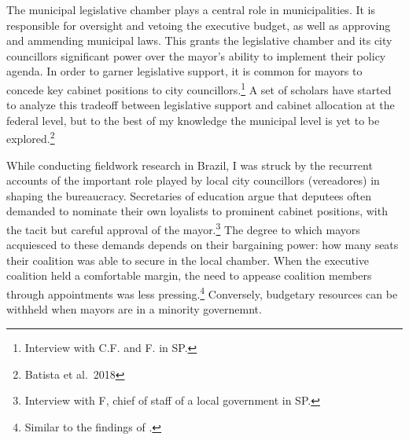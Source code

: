 \documentclass[12pt,]{book}
\newenvironment{Shaded}{\begin{snugshade}}{\end{snugshade}}
\newcommand{\CharTok}[1]{\textcolor[rgb]{0.31,0.60,0.02}{#1}}
\newcommand{\DataTypeTok}[1]{\textcolor[rgb]{0.13,0.29,0.53}{#1}}
\newcommand{\DecValTok}[1]{\textcolor[rgb]{0.00,0.00,0.81}{#1}}
\newcommand{\FloatTok}[1]{\textcolor[rgb]{0.00,0.00,0.81}{#1}}
\newcommand{\KeywordTok}[1]{\textcolor[rgb]{0.13,0.29,0.53}{\textbf{#1}}}
\newcommand{\NormalTok}[1]{#1}
\newcommand{\OperatorTok}[1]{\textcolor[rgb]{0.81,0.36,0.00}{\textbf{#1}}}
\newcommand{\StringTok}[1]{\textcolor[rgb]{0.31,0.60,0.02}{#1}}
\let\rmarkdownfootnote\footnote%
\def\footnote{\protect\rmarkdownfootnote}
\begin{document}
The municipal legislative chamber plays a central role in municipalities. It is responsible for oversight and vetoing the executive budget, as well as approving and ammending municipal laws. This grants the legislative chamber and its city councillors significant power over the mayor's ability to implement their policy agenda. In order to garner legislative support, it is common for mayors to concede key cabinet positions to city councillors.\footnote{Interview with C.F. and F. in SP.} A set of scholars have started to analyze this tradeoff between legislative support and cabinet allocation at the federal level, but to the best of my knowledge the municipal level is yet to be explored.\footnote{Batista et al.~2018}

While conducting fieldwork research in Brazil, I was struck by the recurrent accounts of the important role played by local city councillors (vereadores) in shaping the bureaucracy. Secretaries of education argue that deputees often demanded to nominate their own loyalists to prominent cabinet positions, with the tacit but careful approval of the mayor.\footnote{Interview with F, chief of staff of a local government in SP.} The degree to which mayors acquiesced to these demands depends on their bargaining power: how many seats their coalition was able to secure in the local chamber. When the executive coalition held a comfortable margin, the need to appease coalition members through appointments was less pressing.\footnote{Similar to the findings of \citet{neto_presidential_2006}.} Conversely, budgetary resources can be withheld when mayors are in a minority governemnt.

\begin{Shaded}
\end{Shaded}
\end{document}
